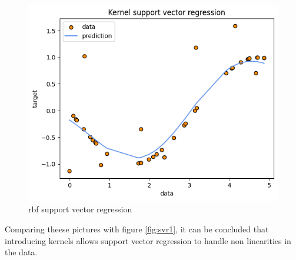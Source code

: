 \begin{figure}
    \includegraphics[width=\textwidth]{images/svr3.png}
    \caption{rbf support vector regression}
    \label{fig:svr3}
\end{figure}
Comparing theese pictures with figure \ref{fig:svr1}, it can be concluded that introducing kernels allows support vector regression to handle non linearities in the data.
